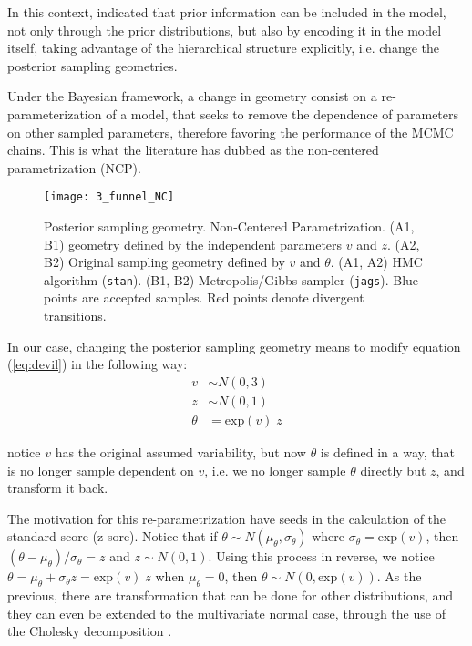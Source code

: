 In this context, \citet{Betancourt_et_al_2013} indicated that prior information can be included in the model, not only through the prior distributions, but also by encoding it in the model itself, taking advantage of the hierarchical structure explicitly, i.e. change the posterior sampling geometries. 

Under the Bayesian framework, a change in geometry consist on a re-parameterization of a model, that seeks to remove the dependence of parameters on other sampled parameters, therefore favoring the performance of the MCMC chains. This is what the literature has dubbed as the non-centered parametrization (NCP).
%
\begin{figure}[h]
	\centering
	\texttt{[image: 3\_funnel\_NC]}
	\caption[Posterior sampling geometry. Non-Centered Parametrization.]%
	{Posterior sampling geometry. Non-Centered Parametrization. (A1, B1) geometry defined by the independent parameters $v$ and $z$. (A2, B2) Original sampling geometry defined by $v$ and $\theta$. (A1, A2) HMC algorithm (\texttt{stan}). (B1, B2) Metropolis/Gibbs sampler (\texttt{jags}). Blue points are accepted samples. Red points denote divergent transitions.}
	\label{fig:devil_NC_geom}
\end{figure}

In our case, changing the posterior sampling geometry means to modify equation (\ref{eq:devil}) in the following way:
%
\begin{equation} \label{eq:devil_NC}
	\begin{split}	
		v &\sim N(0, 3) \\
		z &\sim N(0, 1) \\
		\theta &= \text{exp}(v) \; z
	\end{split}
\end{equation}

\noindent notice $v$ has the original assumed variability, but now $\theta$ is defined in a way, that is no longer sample dependent on $v$, i.e. we no longer sample $\theta$ directly but $z$, and transform it back.

The motivation for this re-parametrization have seeds in the calculation of the standard score (z-sore). Notice that if $\theta \sim N(\mu_{\theta}, \sigma_{\theta})$ where $\sigma_{\theta} = \text{exp}(v)$, then $(\theta - \mu_{\theta})/\sigma_{\theta} = z$ and $z \sim N(0,1)$. Using this process in reverse, we notice $\theta = \mu_{\theta} + \sigma_{\theta} z = \text{exp}(v) \; z$ when $\mu_{\theta}=0$, then $\theta \sim N(0, \text{exp}(v))$. As the previous, there are transformation that can be done for other distributions, and they can even be extended to the multivariate normal case, through the use of the Cholesky decomposition \cite{McElreath_2020}.

